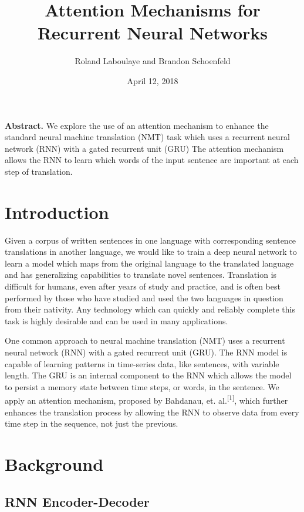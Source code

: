 \documentclass[letterpaper, 10pt]{article}
\begin{document}
\title{Attention Mechanisms for Recurrent Neural Networks}
\author{Roland Laboulaye and Brandon Schoenfeld}
\date{April 12, 2018}
\maketitle

\begin{multicols}{2}

\noindent \textbf{Abstract.}
We explore the use of an attention mechanism to enhance the standard neural machine translation (NMT)
task which uses a recurrent neural network (RNN) with a gated recurrent unit (GRU)
The attention mechanism allows the RNN to learn which words of the input sentence are important at
each step of translation.

\section{Introduction}
Given a corpus of written sentences in one language with corresponding sentence translations in
another language, we would like to train a deep neural network to learn a model which maps from the
original language to the translated language and has generalizing capabilities to translate novel
sentences.
Translation is difficult for humans, even after years of study and practice, and is often best
performed by those who have studied and used the two languages in question from their nativity.
Any technology which can quickly and reliably complete this task is highly desirable and can be used
in many applications.

One common approach to neural machine translation (NMT) uses a recurrent neural network (RNN) with
a gated recurrent unit (GRU).
The RNN model is capable of learning patterns in time-series data,
like sentences, with variable length.
The GRU is an internal component to the RNN which allows the model to persist a memory state between
time steps, or words, in the sentence.
We apply an attention mechanism, proposed by Bahdanau, et. al.\textsuperscript{[1]}, which further
enhances the translation process by allowing the RNN to observe data from every time step in the
sequence, not just the previous.

\section{Background}
\subsection{RNN Encoder-Decoder}


\end{multicols}
\end{document}
